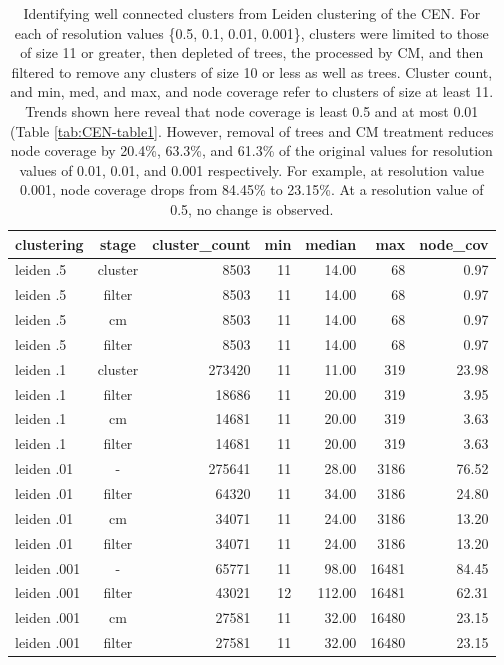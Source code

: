 \documentclass[11pt]{article}   	%
\begin{document}
\begin{table}[H]
\centering
\begin{tabular}{lcrrrrr}
  \hline
 clustering & stage & cluster\_count & min & median & max & node\_cov \\
  \hline
 leiden .5 & cluster & 8503 &  11 & 14.00 &  68 & 0.97 \\
  leiden .5 & filter & 8503 &  11 & 14.00 &  68 & 0.97 \\
  leiden .5 & cm & 8503 &  11 & 14.00 &  68 & 0.97 \\
leiden .5 & filter & 8503 &  11 & 14.00 &  68 & 0.97 \\
\hline
   leiden .1 & cluster  & 273420 &  11 & 11.00 & 319 & 23.98 \\
  leiden .1 & filter & 18686 &  11 & 20.00 & 319 & 3.95 \\
   leiden .1 & cm & 14681 &  11 & 20.00 & 319 & 3.63 \\
  leiden .1 & filter & 14681 &  11 & 20.00 & 319 & 3.63 \\
  \hline
   leiden .01 & -& 275641 &  11 & 28.00 & 3186 & 76.52 \\
   leiden .01 & filter & 64320 &  11 & 34.00 & 3186 & 24.80 \\
   leiden .01 & cm & 34071 &  11 & 24.00 & 3186 & 13.20 \\
   leiden .01 & filter & 34071 &  11 & 24.00 & 3186 & 13.20 \\
   \hline
   leiden .001 & - & 65771 &  11 & 98.00 & 16481 & 84.45 \\
   leiden .001 & filter & 43021 &  12 & 112.00 & 16481 & 62.31 \\
  leiden .001 & cm & 27581 &  11 & 32.00 & 16480 & 23.15 \\
   leiden .001 & filter & 27581 &  11 & 32.00 & 16480 & 23.15 \\
   \hline
\end{tabular}
\caption{Identifying well connected clusters from Leiden clustering of the CEN. For each of resolution values \{0.5, 0.1, 0.01, 0.001\}, clusters were limited to those of size 11 or greater, then depleted of trees, the processed by CM, and then filtered to remove any clusters of size 10 or less as well as trees. Cluster count, and min, med, and max, and node coverage refer to clusters of size at least 11.
Trends shown here reveal that node coverage is least 0.5 and at most  0.01 (Table \ref{tab:CEN-table1}. However, removal of trees and CM treatment reduces node coverage by 20.4\%, 63.3\%, and 61.3\% of the original values for resolution values of 0.01, 0.01, and 0.001 respectively.  For example, at resolution value 0.001, node coverage drops from 84.45\% to 23.15\%. At a resolution value of 0.5, no change is observed.}
\label{tab:CEN-table2}
\end{table}
\end{document}
